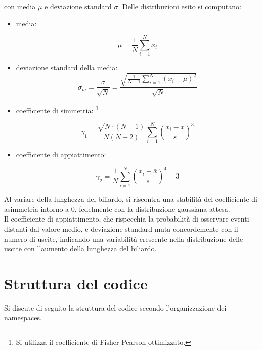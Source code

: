 \documentclass{article}
\begin{document}
con media \(\mu\) e deviazione standard \(\sigma\).
Delle distribuzioni esito si computano:
\begin{itemize}
    \item media:

\begin{equation}
    \mu = \frac{1}{N} \sum_{i=1}^N x_i
\end{equation}

\item deviazione standard della media:
\begin{equation}
    \sigma_m = \frac{\sigma}{\sqrt{N}} = \frac{\sqrt{\frac{1}{N-1} \sum_{i=1}^N (x_i - \mu)^2}}{\sqrt{N}}
\end{equation}



\item coefficiente di simmetria:
\footnote{Si utilizza il coefficiente di Fisher-Pearson ottimizzato.}

\begin{equation}
    \gamma_1 = \frac{\sqrt{N\cdot (N-1)}}{N(N-2)} \sum_{i=1}^N \left(\frac{x_i - \bar{x}}{s}\right)^3
\end{equation}

\item coefficiente di appiattimento:

\begin{equation}
   \gamma_2 =  \frac{1}{N}\sum_{i=1}^N \left(\frac{x_i - \bar{x}}{s}\right)^4 - 3
\end{equation}
\end{itemize}
Al variare della lunghezza del biliardo, si riscontra una stabilità del coefficiente di asimmetria intorno a 0, fedelmente con la distribuzione gaussiana attesa.\\
Il coefficiente di appiattimento, che rispecchia la probabilità di osservare eventi distanti dal valore medio, e deviazione standard muta concordemente con il numero di uscite, indicando una variabilità crescente nella distribuzione delle uscite con l'aumento della lunghezza del biliardo.


\section{Struttura del codice}
Si discute di seguito la struttura del codice secondo l'organizzazione dei namespaces.
\end{document}
